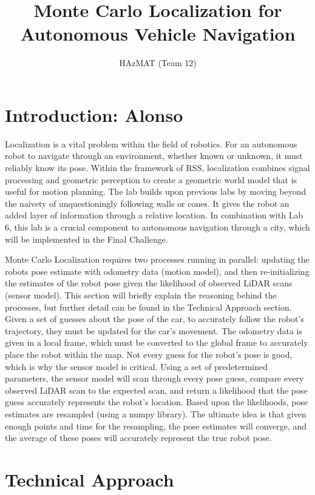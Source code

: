 \documentclass{article}
\title{Monte Carlo Localization for Autonomous Vehicle Navigation}
\author{HAzMAT (Team 12)}
\begin{document}
\maketitle



\section{Introduction: Alonso}

Localization is a vital problem within the field of robotics. For an autonomous robot to navigate through an environment, whether known or unknown, it must reliably know its pose. Within the framework of RSS, localization combines signal processing and geometric perception to create a geometric world model that is useful for motion planning. The lab builds upon previous labs by moving beyond the naivety of unquestioningly following walls or cones. It gives the robot an added layer of information through a relative location. In combination with Lab 6, this lab is a crucial component to autonomous navigation through a city, which will be implemented in the Final Challenge. 

Monte Carlo Localization requires two processes running in parallel: updating the robots pose estimate with odometry data (motion model), and then re-initializing the estimates of the robot pose given the likelihood of observed LiDAR scans (sensor model). This section will briefly explain the reasoning behind the processes, but further detail can be found in the Technical Approach section. Given a set of guesses about the pose of the car, to accurately follow the robot's trajectory, they must be updated for the car's movement. The odometry data is given in a local frame, which must be converted to the global frame to accurately place the robot within the map. Not every guess for the robot's pose is good, which is why the sensor model is critical. Using a set of predetermined parameters, the sensor model will scan through every pose guess, compare every observed LiDAR scan to the expected scan, and return a likelihood that the pose guess accurately represents the robot's location. Based upon the likelihoods, pose estimates are resampled (using a numpy library). The ultimate idea is that given enough points and time for the resampling, the pose estimates will converge, and the average of these poses will accurately represent the true robot pose.



\section{Technical Approach}
\end{document}
